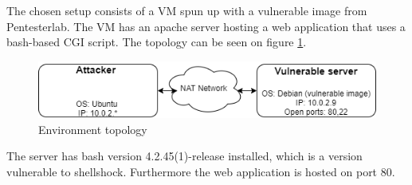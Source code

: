 
The chosen setup consists of a VM spun up with a vulnerable image from Pentesterlab\cite{pentesterlab}. The VM has an apache server hosting a web application that uses a bash-based CGI script. The topology can be seen on figure \ref{fig:network-topology}. 
\begin{figure} [ht]
    \centering
    \includegraphics[width=\columnwidth]{drawio/topology.png}
    \caption{Environment topology}
    \label{fig:network-topology}
\end{figure} 

The server has bash version 4.2.45(1)-release installed, which is a version vulnerable to shellshock. Furthermore the web application is hosted on port 80. 




 